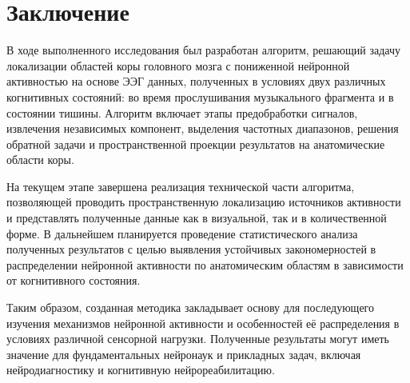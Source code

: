 \chapter*{Заключение}
В ходе выполненного исследования был разработан алгоритм, решающий задачу локализации областей коры головного мозга с пониженной нейронной активностью на основе ЭЭГ данных, полученных в условиях двух различных когнитивных состояний: во время прослушивания музыкального фрагмента и в состоянии тишины. Алгоритм включает этапы предобработки сигналов, извлечения независимых компонент, выделения частотных диапазонов, решения обратной задачи и пространственной проекции результатов на анатомические области коры.

На текущем этапе завершена реализация технической части алгоритма, позволяющей проводить пространственную локализацию источников активности и представлять полученные данные как в визуальной, так и в количественной форме. В дальнейшем планируется проведение статистического анализа полученных результатов с целью выявления устойчивых закономерностей в распределении нейронной активности по анатомическим областям в зависимости от когнитивного состояния.

Таким образом, созданная методика закладывает основу для последующего изучения механизмов нейронной активности и особенностей её распределения в условиях различной сенсорной нагрузки. Полученные результаты могут иметь значение для фундаментальных нейронаук и прикладных задач, включая нейродиагностику и когнитивную нейрореабилитацию.

\endinput